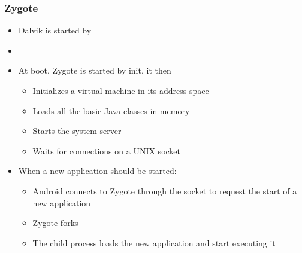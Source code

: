\begin{frame}
  \frametitle{Zygote}
  \begin{itemize}
    \item Dalvik is started by 
    \item {}
    \item At boot, Zygote is started by init, it then
      \begin{itemize}
      \item Initializes a virtual machine in its address space
      \item Loads all the basic Java classes in memory
      \item Starts the system server
      \item Waits for connections on a UNIX socket
      \end{itemize}
    \item When a new application should be started:
      \begin{itemize}
      \item Android connects to Zygote through the socket to request
        the start of a new application
      \item Zygote forks
      \item The child process loads the new application and start
        executing it
      \end{itemize}
  \end{itemize}
\end{frame}
